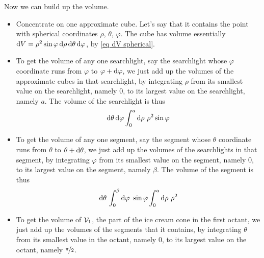\begin{eg}
Now we can build up the volume.
\begin{itemize}
\item
Concentrate on one approximate cube. Let's say that it contains the point 
with spherical coordinates $\rho$, $\theta$, $\varphi$.
The cube has volume essentially $\mathrm{d}V 
  = \rho^2\sin\varphi\,\mathrm{d}\rho\,\mathrm{d}\theta\,\mathrm{d}\varphi$,
by \eqref{eq dV spherical}.

\item
To get the volume of any one searchlight, say the searchlight whose 
$\varphi$ coordinate runs from $\varphi$ to $\varphi+\mathrm{d}\varphi$, 
we just add up the volumes of the approximate cubes in that searchlight, 
by integrating $\rho$ from its smallest value on the searchlight, namely $0$, 
to its largest value on the searchlight, namely $a$. The volume of the 
searchlight is thus
\begin{align*}
\mathrm{d}\theta\,\mathrm{d}\varphi\int_0^a\mathrm{d}\rho\  \rho^2\sin\varphi
\end{align*}

\item
To get the volume of any one segment, say the segment whose $\theta$ 
coordinate runs from $\theta$ to $\theta+\mathrm{d}\theta$, we just 
add up the volumes of the searchlights in that segment, by integrating 
$\varphi$ from its smallest value on the segment, namely $0$, to its 
largest value on the segment, namely $\beta$. The volume of the segment 
is thus
\begin{align*}
\mathrm{d}\theta\,\int_0^\beta \mathrm{d}\varphi\ \sin\varphi
               \int_0^a\mathrm{d}\rho\  \rho^2
\end{align*}

\item
To get the volume of $\mathcal{V}_1$, the part of the ice cream cone in the first 
octant, we just add up the volumes of the segments that it contains, by 
integrating $\theta$ from its smallest value in the octant, namely $0$, to its largest value on the octant, namely  $\nicefrac{\pi}{2}$. 


\end{itemize}
\end{eg}
